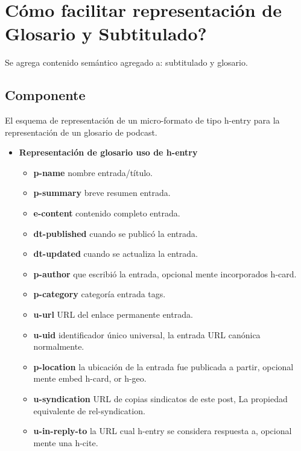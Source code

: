 \section{\textquestiondown Cómo facilitar representación de Glosario y Subtitulado?}

Se agrega contenido semántico agregado a: subtitulado y glosario. 

\subsection{Componente}

El esquema de representación de un micro-formato de tipo h-entry para la
representación de un glosario de podcast. \cite{hEntry}

\begin{itemize}

\item \textbf{Representación de glosario uso de h-entry}

\begin{itemize}

\item \textbf{p-name} nombre entrada/título.
\item \textbf{p-summary} breve resumen entrada.
\item \textbf{e-content} contenido completo entrada.
\item \textbf{dt-published} cuando se publicó la entrada.
\item \textbf{dt-updated} cuando se actualiza la entrada.
\item \textbf{p-author} que escribió la entrada, opcional mente incorporados
h-card.
\item \textbf{p-category} categoría entrada tags.
\item \textbf{u-url} URL del enlace permanente entrada.
\item \textbf{u-uid} identificador único universal, la entrada URL canónica
normalmente.
\item \textbf{p-location} la ubicación de la entrada fue publicada a partir,
opcional mente embed h-card, or h-geo.
\item \textbf{u-syndication} URL de copias sindicatos de este post, La propiedad
equivalente de rel-syndication.
\item \textbf{u-in-reply-to} la URL cual h-entry se considera respuesta a, 
opcional mente una h-cite.

\end{itemize}


\end{itemize}
